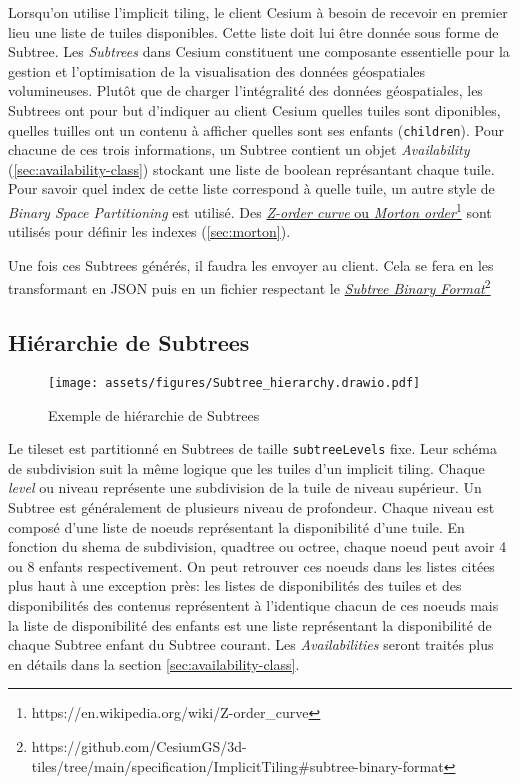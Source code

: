 Lorsqu'on utilise l'implicit tiling, le client Cesium à besoin de recevoir en premier lieu une liste de tuiles disponibles. Cette liste doit lui être donnée sous forme de Subtree. Les \textit{Subtrees} dans Cesium constituent une composante essentielle pour la gestion et l'optimisation de la visualisation des données géospatiales volumineuses. Plutôt que de charger l'intégralité des données géospatiales, les Subtrees ont pour but d'indiquer au client Cesium quelles tuiles sont diponibles, quelles tuilles ont un contenu à afficher quelles sont ses enfants (\texttt{children}). Pour chacune de ces trois informations, un Subtree contient un objet \textit{Availability} (\autoref{sec:availability-class}) stockant une liste de boolean représantant chaque tuile. Pour savoir quel index de cette liste correspond à quelle tuile, un autre style de \textit{Binary Space Partitioning} est utilisé. Des \href{https://en.wikipedia.org/wiki/Z-order\_curve}{\textit{Z-order curve} ou \textit{Morton order}}\footnote{https://en.wikipedia.org/wiki/Z-order\_curve} sont utilisés pour définir les indexes (\autoref{sec:morton}).

Une fois ces Subtrees générés, il faudra les envoyer au client. Cela se fera en les transformant en JSON puis en un fichier respectant le \href{https://github.com/CesiumGS/3d-tiles/tree/main/specification/ImplicitTiling\#subtree-binary-format}{\textit{Subtree Binary Format}}\footnote{https://github.com/CesiumGS/3d-tiles/tree/main/specification/ImplicitTiling\#subtree-binary-format}

\subsection*{Hiérarchie de Subtrees}

\begin{figure}[H]
    \centering
    \texttt{[image: assets/figures/Subtree\_hierarchy.drawio.pdf]}
    \caption{Exemple de hiérarchie de Subtrees}
    \label{fig:Tilesets}
\end{figure}

Le tileset est partitionné en Subtrees de taille \texttt{subtreeLevels} fixe. Leur schéma de subdivision suit la même logique que les tuiles d'un implicit tiling. Chaque \textit{level} ou niveau représente une subdivision de la tuile de niveau supérieur. Un Subtree est généralement de plusieurs niveau de profondeur. Chaque niveau est composé d'une liste de noeuds représentant la disponibilité d'une tuile. En fonction du shema de subdivision, quadtree ou octree, chaque noeud peut avoir 4 ou 8 enfants respectivement. On peut retrouver ces noeuds dans les listes citées plus haut à une exception près: les listes de disponibilités des tuiles et des disponibilités des contenus représentent à l'identique chacun de ces noeuds mais la liste de disponibilité des enfants est une liste représentant la disponibilité de chaque Subtree enfant du Subtree courant. Les \textit{Availabilities} seront traités plus en détails dans la section \ref{sec:availability-class}.


